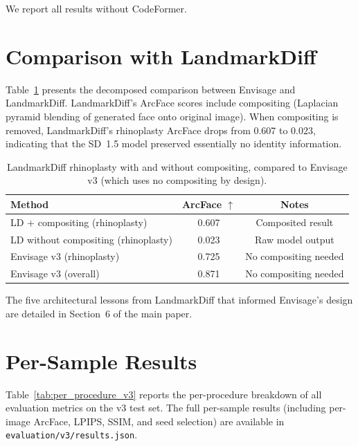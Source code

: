 \documentclass[10pt,twocolumn,letterpaper]{article}
\newcommand{\method}{Envisage}
\begin{document}
We report all results without CodeFormer.

\section{Comparison with LandmarkDiff}

Table~\ref{tab:landmarkdiff_decomposed} presents the decomposed
comparison between \method{} and LandmarkDiff. LandmarkDiff's ArcFace
scores include compositing (Laplacian pyramid blending of generated face
onto original image). When compositing is removed, LandmarkDiff's
rhinoplasty ArcFace drops from 0.607 to 0.023, indicating that the
SD~1.5 model preserved essentially no identity information.

\begin{table}[H]
\centering
\caption{LandmarkDiff rhinoplasty with and without compositing, compared
to \method{} v3 (which uses no compositing by design).}
\label{tab:landmarkdiff_decomposed}
\begin{tabular}{@{}lcc@{}}
\toprule
\textbf{Method} & \textbf{ArcFace} $\uparrow$ & \textbf{Notes} \\
\midrule
LD + compositing (rhinoplasty)      & 0.607 & Composited result \\
LD without compositing (rhinoplasty) & 0.023 & Raw model output \\
\method{} v3 (rhinoplasty)          & 0.725 & No compositing needed \\
\method{} v3 (overall)              & 0.871 & No compositing needed \\
\bottomrule
\end{tabular}
\end{table}

The five architectural lessons from LandmarkDiff that informed
\method{}'s design are detailed in Section~6 of the main paper.

\section{Per-Sample Results}

Table~\ref{tab:per_procedure_v3} reports the per-procedure breakdown of
all evaluation metrics on the v3 test set. The full per-sample results
(including per-image ArcFace, LPIPS, SSIM, and seed selection) are
available in \texttt{evaluation/v3/results.json}.
\end{document}
